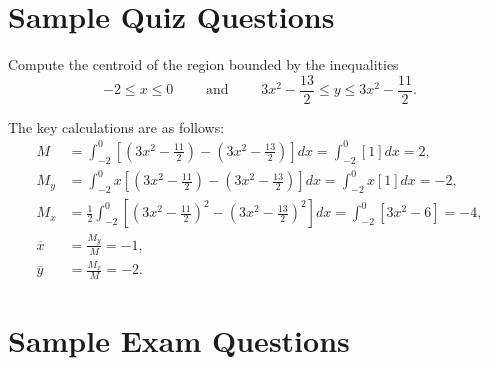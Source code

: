 \documentclass{ximera}
\begin{document}
\section*{Sample Quiz Questions}
\begin{question}%

Compute the centroid of the region bounded by the inequalities \[-2 \leq x \leq 0 \qquad \text{ and } \qquad {3x^2-\frac{13}{2}} \leq y \leq {3x^2-\frac{11}{2}}.\]
\begin{multiplechoice}
\end{multiplechoice}
\begin{feedback}
The key calculations are as follows: 
\[ \begin{aligned}
M & = \int_{-2}^{0} \left[ \left({3x^2-\frac{11}{2}}\right) - \left({3x^2-\frac{13}{2}}\right) \right] dx = \int_{-2}^{0} \left[{1}\right] dx = 2, \\
M_y & = \int_{-2}^{0} x \left[ \left({3x^2-\frac{11}{2}}\right) - \left({3x^2-\frac{13}{2}}\right) \right] dx = \int_{-2}^{0} x \left[{1}\right] dx = -2, \\
M_x & = \frac{1}{2} \int_{-2}^{0} \left[ \left({3x^2-\frac{11}{2}}\right)^2 - \left({3x^2-\frac{13}{2}}\right)^2 \right] dx = \int_{-2}^{0} \left[{3x^2-6}\right] = -4, \\
 \overline{x} &  = \frac{M_y}{M} = -1, \\
 \overline{y} &  = \frac{M_x}{M} = -2.\end{aligned}\]
\end{feedback}

\end{question}

\section*{Sample Exam Questions}
\end{document}
